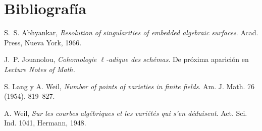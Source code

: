 
\section*{Bibliografía}

\noindent[1]\quad S.~S. Abhyankar, \emph{Resolution of singularities of embedded algebraic surfaces}. Acad. Press, Nueva York, 1966.\par
\medskip
\noindent[2]\quad J.~P. Jouanolou, \emph{Cohomologie $\ell$-adique des schémas}. De próxima aparición en \emph{Lecture Notes of Math.}\par
\medskip
\noindent[3]\quad S. Lang y A. Weil, \emph{Number of points of varieties in finite fields}. Am. J. Math. 76 (1954), 819--827.\par
\medskip
\noindent[4]\quad A. Weil, \emph{Sur les courbes algébriques et les variétés qui s'en déduisent}. Act. Sci. Ind. 1041, Hermann, 1948.\par
